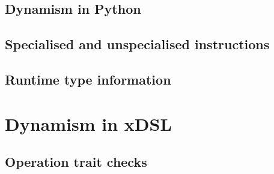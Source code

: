 




\subsection{Dynamism in Python}


\subsection{Specialised and unspecialised instructions}




\subsection{Runtime type information}








\section{Dynamism in xDSL}


\subsection{Operation trait checks}

